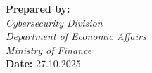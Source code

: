 \documentclass[12pt,a4paper]{report}
\begin{document}
\vspace{1cm}

\begin{center}
    \textbf{Prepared by:}\\
    \textit{Cybersecurity Division}\\
    \textit{Department of Economic Affairs}\\
    \textit{Ministry of Finance}\\[0.5cm]
    \textbf{Date:} 27.10.2025
\end{center}
\end{document}
